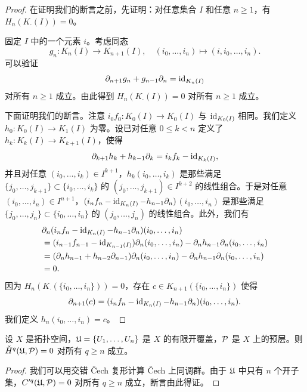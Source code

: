 \begin{proof}
在证明我们的断言之前，先证明：对任意集合 $I$ 和任意 $n\ge 1$，有 $H_n(K_\cdot(I))=0$。

固定 $I$ 中的一个元素 $i$。考虑同态
\[
g_n\colon K_n(I)\to K_{n+1}(I),\quad (i_0,\dots,i_n)\mapsto (i,i_0,\dots,i_n).
\]
可以验证
\[
\partial_{n+1}g_n+g_{n-1}\partial_n=\operatorname{id}_{K_n(I)}
\]
对所有 $n\ge 1$ 成立。由此得到 $H_n(K_\cdot(I))=0$ 对所有 $n\ge 1$ 成立。

下面证明我们的断言。注意 $i_0f_0\colon K_0(I)\to K_0(I)$ 与 $\operatorname{id}_{K_0(I)}$ 相同。我们定义 $h_0\colon K_0(I)\to K_1(I)$ 为零。设已对任意 $0\le k<n$ 定义了 $h_k\colon K_k(I)\to K_{k+1}(I)$，使得
\[
\partial_{k+1}h_k+h_{k-1}\partial_k=i_kf_k-\operatorname{id}_{K_k(I)},
\]
并且对任意 $(i_0,\dots,i_k)\in I^{k+1}$，$h_k(i_0,\dots,i_k)$ 是那些满足\allowbreak $\{j_0,\dots,j_{k+1}\}\subset\{i_0,\dots,i_k\}$ 的 $(j_0,\dots,j_{k+1})\in I^{k+2}$ 的线性组合。于是对任意 $(i_0,\dots,i_n)\in I^{n+1}$，\allowbreak $(i_nf_n-\operatorname{id}_{K_n(I)}-h_{n-1}\partial_n)$\allowbreak $(i_0,\dots,i_n)$ 是那些满足\allowbreak $\{j_0,\dots,j_n\}\subset\{i_0,\dots,i_n\}$ 的 $(j_0,\dots,j_n)$ 的线性组合。此外，我们有
\begin{align*}
&\partial_n(i_nf_n-\operatorname{id}_{K_n(I)}-h_{n-1}\partial_n)(i_0,\dots,i_n)\\
&=(i_{n-1}f_{n-1}-\operatorname{id}_{K_{n-1}(I)})\partial_n(i_0,\dots,i_n)-\partial_nh_{n-1}\partial_n(i_0,\dots,i_n)\\
&=(\partial_nh_{n-1}+h_{n-2}\partial_{n-1})\partial_n(i_0,\dots,i_n)-\partial_nh_{n-1}\partial_n(i_0,\dots,i_n)\\
&=0.
\end{align*}
因为 $H_n(K_\cdot(\{i_0,\dots,i_n\}))=0$，存在 $c\in K_{n+1}(\{i_0,\dots,i_n\})$ 使得
\[
\partial_{n+1}(c)=(i_nf_n-\operatorname{id}_{K_n(I)}-h_{n-1}\partial_n)(i_0,\dots,i_n).
\]
我们定义 $h_n(i_0,\dots,i_n)=c$。
\end{proof}

\begin{corollary}\label{it:2.3.2}
设 $X$ 是拓扑空间，$\mathfrak{U}=\{U_1,\dots,U_n\}$ 是 $X$ 的有限开覆盖，$\mathcal{P}$ 是 $X$ 上的预层。则 $\check{H}^q(\mathfrak{U},\mathcal{P})=0$ 对所有 $q\ge n$ 成立。
\end{corollary}

\begin{proof}
我们可以用交错 \v{C}ech 复形计算 \v{C}ech 上同调群。由于 $\mathfrak{U}$ 中只有 $n$ 个开子集，$C'^q(\mathfrak{U},\mathcal{P})=0$ 对所有 $q\ge n$ 成立，断言由此得证。
\end{proof}

